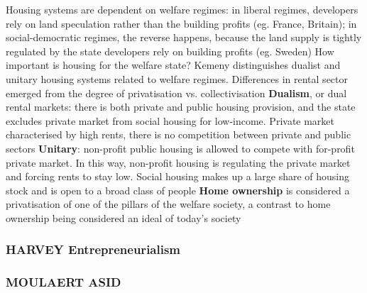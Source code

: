 \documentclass{article}
\begin{document}
\begin{outline}
		\2 Housing systems are dependent on welfare regimes: in liberal regimes, developers rely on land speculation rather than the building profits (eg. France, Britain); in social-democratic regimes, the reverse happens, because the land supply is tightly regulated by the state developers rely on building profits (eg. Sweden)
		\2 How important is housing for the welfare state?	Kemeny distinguishes dualist and unitary housing systems related to welfare regimes. Differences in rental sector emerged from the degree of privatisation vs. collectivisation
		\2 \textbf{Dualism}, or dual rental markets: there is both private and public housing provision, and the state excludes private market from social housing for low-income. Private market characterised by high rents, there is no competition between private and public sectors
		\2 \textbf{Unitary}: non-profit public housing is allowed to compete with for-profit private market. In this way, non-profit housing is regulating the private market and forcing rents to stay low. Social housing makes up a large share of housing stock and is open to a broad class of people
	\1 \textbf{Home ownership} is considered a privatisation of one of the pillars of the welfare society, a contrast to home ownership being considered an ideal of today's society
\end{outline}

\subsubsection{HARVEY Entrepreneurialism}

\begin{outline}
	\1 
\end{outline}

\subsubsection{MOULAERT ASID}

\begin{outline}
	\1 
\end{outline}




\begin{comment}
\begin{chronology}[10]{1900}{2010}{100ex}[\textwidth]
\event{1930}{Bismarckian (pioneers)}
\event{1960}{Beveridgian (divergence)}
\event{1997}{Convergence}
\end{chronology}
\end{comment}

\printbibliography
\end{document}
